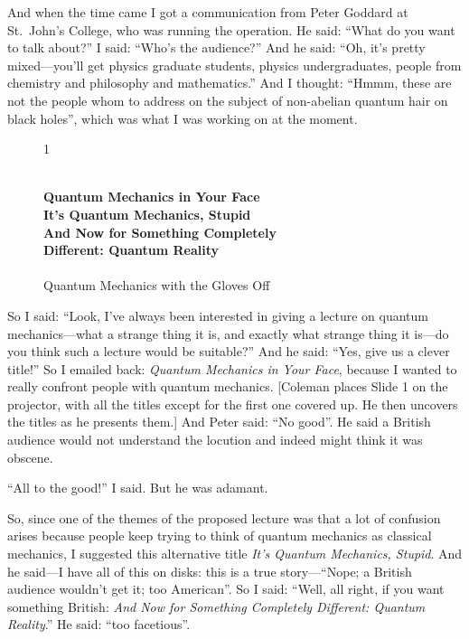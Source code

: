 \documentclass[12pt,nofootinbib]{revtex4}
\begin{document}
And when the time came I got a communication from Peter Goddard at St.~John's College, who was running the operation. He said: ``What do you want to talk about?'' I said: ``Who's the audience?'' And he said: ``Oh, it's pretty mixed---you'll get physics graduate students, physics undergraduates, people from chemistry and philosophy and mathematics.'' And I thought: ``Hmmm, these are not the people whom to address on the subject of non-abelian quantum hair on black holes'', which was what I was working on at the moment.
\begin{figure}[htb] 
\begin{mdframed}
  \vspace{5pt}\hfill 1\\[-15pt]
  \begin{center}
  \begin{obeylines}{\bf
  Quantum Mechanics in Your Face\\[8pt]
  It's Quantum Mechanics, Stupid\\[8pt]
  And Now for Something Completely
  Different: Quantum Reality\\[8pt]
  }
  {Quantum Mechanics with the Gloves Off}\\[10pt]
  \vspace{8pt}
  \end{obeylines}
\end{center}
\end{mdframed}
\end{figure}

So I said: ``Look, I've always been interested in giving a lecture on quantum mechanics---what a strange thing it is, and exactly what strange thing it is---do you think such a lecture would be suitable?'' And he said: ``Yes, give us a clever title!'' So I emailed back: \emph{Quantum Mechanics in Your Face}, because I wanted to really confront people with quantum mechanics. [Coleman places Slide 1 on the projector, with all the titles except for the first one covered up.  He then uncovers the titles as he presents them.] And Peter said: ``No good''. He said a British audience would not understand the locution and indeed might think it was obscene.

``All to the good!'' I said. But he was adamant.

So, since one of the themes of the proposed lecture was that a lot of confusion arises because people keep trying to think of quantum mechanics as classical mechanics, I suggested this alternative title \emph{It's Quantum Mechanics, Stupid}. And he said---I have all of this on disks: this is a true story---``Nope; a British audience wouldn't get it; too American''. So I said: ``Well, all right, if you want something British: \emph{And Now for Something Completely Different: Quantum Reality}.'' He said: ``too facetious''.
\end{document}
